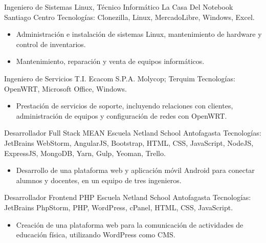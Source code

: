 \documentclass[12pt,letterpaper,sans]{moderncv}
\begin{document}
{Ingeniero de Sistemas Linux, Técnico Informático}
{La Casa Del Notebook}
{\newline Santiago Centro}
{\newline Tecnologías: Clonezilla, Linux, MercadoLibre, Windows, Excel.}
{
  \begin{itemize}
    \item Administración e instalación de sistemas Linux, mantenimiento de hardware y control de inventarios.
    \item Mantenimiento, reparación y venta de equipos informáticos.
  \end{itemize}
}
\vspace{0.5em}

{Ingeniero de Servicios T.I.}
{Ecacom S.P.A.}
{\newline Molycop; Terquim}
{\newline Tecnologías: OpenWRT, Microsoft Office, Windows.}
{
  \begin{itemize}
    \item Prestación de servicios de soporte, incluyendo relaciones con clientes, administración de equipos y configuración de redes con OpenWRT.
  \end{itemize}
}
\vspace{0.5em}

{Desarrollador Full Stack MEAN}
{Escuela Netland School}
{\newline Antofagasta}
{\newline Tecnologías: JetBrains WebStorm, AngularJS, Bootstrap, HTML, CSS, JavaScript, NodeJS, ExpressJS, MongoDB, Yarn, Gulp, Yeoman, Trello.}
{
  \begin{itemize}
    \item Desarrollo de una plataforma web y aplicación móvil Android para conectar alumnos y docentes, en un equipo de tres ingenieros.
  \end{itemize}
}
\vspace{0.5em}

{Desarrollador Frontend PHP}
{Escuela Netland School}
{\newline Antofagasta}
{\newline Tecnologías: JetBrains PhpStorm, PHP, WordPress, cPanel, HTML, CSS, JavaScript.}
{
  \begin{itemize}
    \item Creación de una plataforma web para la comunicación de actividades de educación física, utilizando WordPress como CMS.
  \end{itemize}
}
\vspace{0.5em}
\end{document}
